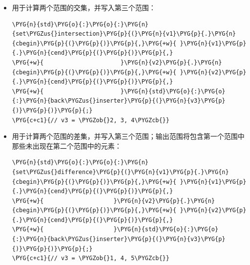 \begin{itemize}

\item {}用于计算两个范围的交集，并写入第三个范围：



\begin{codeblockbg}
\begin{Verbatim}[commandchars=\\\{\},breaklines=true,breakanywhere=true,fontsize=\codefont,xleftmargin=17bp]
\PYG{n}{std}\PYG{o}{:}\PYG{o}{:}\PYG{n}{set\PYGZus{}intersection}\PYG{p}{(}\PYG{n}{v1}\PYG{p}{.}\PYG{n}{cbegin}\PYG{p}{(}\PYG{p}{)}\PYG{p}{,}\PYG{+w}{ }\PYG{n}{v1}\PYG{p}{.}\PYG{n}{cend}\PYG{p}{(}\PYG{p}{)}\PYG{p}{,}
\PYG{+w}{                      }\PYG{n}{v2}\PYG{p}{.}\PYG{n}{cbegin}\PYG{p}{(}\PYG{p}{)}\PYG{p}{,}\PYG{+w}{ }\PYG{n}{v2}\PYG{p}{.}\PYG{n}{cend}\PYG{p}{(}\PYG{p}{)}\PYG{p}{,}
\PYG{+w}{                      }\PYG{n}{std}\PYG{o}{:}\PYG{o}{:}\PYG{n}{back\PYGZus{}inserter}\PYG{p}{(}\PYG{n}{v3}\PYG{p}{)}\PYG{p}{)}\PYG{p}{;}
\PYG{c+c1}{// v3 = \PYGZob{}2, 3, 4\PYGZcb{}}
\end{Verbatim}
\end{codeblockbg}



\item {}用于计算两个范围的差集，并写入第三个范围；输出范围将包含第一个范围中那些未出现在第二个范围中的元素：



\begin{codeblockbg}
\begin{Verbatim}[commandchars=\\\{\},breaklines=true,breakanywhere=true,fontsize=\codefont,xleftmargin=17bp]
\PYG{n}{std}\PYG{o}{:}\PYG{o}{:}\PYG{n}{set\PYGZus{}difference}\PYG{p}{(}\PYG{n}{v1}\PYG{p}{.}\PYG{n}{cbegin}\PYG{p}{(}\PYG{p}{)}\PYG{p}{,}\PYG{+w}{ }\PYG{n}{v1}\PYG{p}{.}\PYG{n}{cend}\PYG{p}{(}\PYG{p}{)}\PYG{p}{,}
\PYG{+w}{                    }\PYG{n}{v2}\PYG{p}{.}\PYG{n}{cbegin}\PYG{p}{(}\PYG{p}{)}\PYG{p}{,}\PYG{+w}{ }\PYG{n}{v2}\PYG{p}{.}\PYG{n}{cend}\PYG{p}{(}\PYG{p}{)}\PYG{p}{,}
\PYG{+w}{                    }\PYG{n}{std}\PYG{o}{:}\PYG{o}{:}\PYG{n}{back\PYGZus{}inserter}\PYG{p}{(}\PYG{n}{v3}\PYG{p}{)}\PYG{p}{)}\PYG{p}{;}
\PYG{c+c1}{// v3 = \PYGZob{}1, 4, 5\PYGZcb{}}
\end{Verbatim}
\end{codeblockbg}



\end{itemize}
